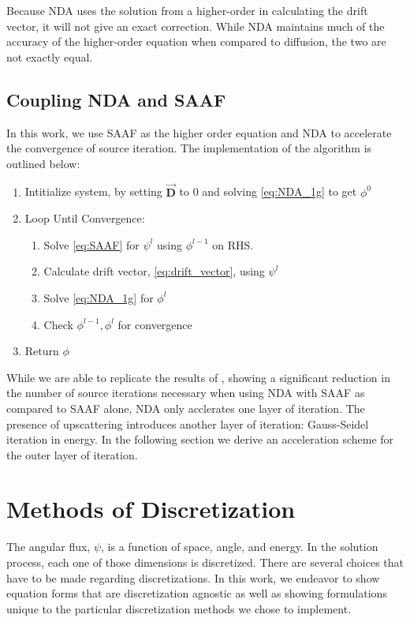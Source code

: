 Because NDA uses the solution from a higher-order in calculating the drift vector, it will not give an exact correction. While NDA maintains much of the accuracy of the higher-order equation when compared to diffusion, the two are not exactly equal. 


\subsection{Coupling NDA and SAAF}
In this work, we use SAAF as the higher order equation and NDA to accelerate the convergence of source iteration. The implementation of the algorithm is outlined below:

\begin{enumerate}
    \item Intitialize system, by setting $\vec{\textbf{D}}$ to 0 and solving \eqref{eq:NDA_1g} to get $\phi^0$ 
    \item Loop Until Convergence:
        \begin{enumerate}
            \item Solve \eqref{eq:SAAF} for $\psi^l$ using $\phi^{l-1}$ on RHS.
            \item Calculate drift vector, \eqref{eq:drift_vector}, using $\psi^l$
            \item Solve \eqref{eq:NDA_1g} for $\phi^l$
            \item Check $\phi^{l-1}, \phi^l$ for convergence
        \end{enumerate}
    \item Return $\phi$
\end{enumerate}

While we are able to replicate the results of \cite{Wang2013}, showing a significant reduction in the number of source iterations necessary when using NDA with SAAF as compared to SAAF alone, NDA only acclerates one layer of iteration. The presence of upscattering introduces another layer of iteration: Gauss-Seidel iteration in energy. In the following section we derive an acceleration scheme for the outer layer of iteration.


\section{Methods of Discretization}
The angular flux, $\psi$, is a function of space, angle, and energy. In the solution process, each one of those dimensions is discretized. There are several choices that have to be made regarding discretizations. In this work, we endeavor to show equation forms that are discretization agnostic as well as showing formulations unique to the particular discretization methods we chose to implement. 

